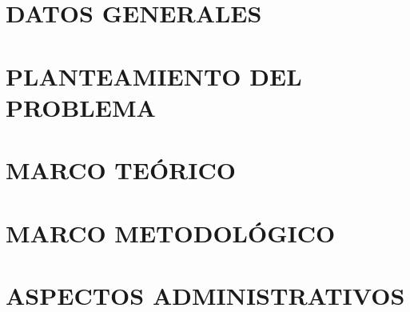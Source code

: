 \documentclass[12pt, oneside, openany]{report}
\begin{document}
\thispagestyle{empty}

\cleardoublepage
{} %

\renewcommand{\contentsname}{ÍNDICE GENERAL}
\tableofcontents
\cleardoublepage


\chapter{DATOS GENERALES}


\chapter{PLANTEAMIENTO DEL PROBLEMA}


\chapter{MARCO TEÓRICO}


\chapter{MARCO METODOLÓGICO}


\chapter{ASPECTOS ADMINISTRATIVOS}


\printbibliography %

\begin{appendix}





\end{appendix}
\end{document}
